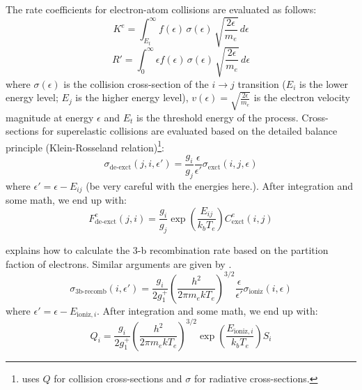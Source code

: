 The rate coefficients for electron-atom collisions are evaluated as follows: 
% 
\begin{equation}
    \label{eq:Rate_ElectronAtomCollisions}
    K^e = \int_{E_t}^\infty f(\epsilon) \, \sigma(\epsilon) \, \sqrt{\frac{2 \epsilon}{m_e}} \, d\epsilon
\end{equation}
% 
\begin{equation}
    \label{eq:Rate_RadiativeRecombination}
    R' = \int_{0}^\infty \epsilon f(\epsilon) \, \sigma(\epsilon) \, \sqrt{\frac{2 \epsilon}{m_e}} \, d\epsilon
\end{equation}
% 
where $\sigma(\epsilon)$ is the collision cross-section of the $i \rightarrow j$ transition ($E_i$ is the lower energy level; $E_j$ is the higher energy level), $v(\epsilon) = \sqrt{\frac{2 \epsilon}{m_e}}$ is the electron velocity magnitude at energy $\epsilon$ and $E_t$ is the threshold energy of the process. Cross-sections for superelastic collisions are evaluated based on the detailed balance principle (Klein-Rosseland relation)\footnote{\citet{oxenius2012kinetic} uses $Q$ for collision cross-sections and $\sigma$ for radiative cross-sections.}: 
%  
\begin{equation}
    \label{eq:cross-section_superelastic}
    \sigma_\text{de-exct}(j,i,\epsilon') = \frac{g_i}{g_j} \frac{\epsilon}{\epsilon'} \sigma_\text{exct}(i,j,\epsilon)  
\end{equation}
% 
where $\epsilon' = \epsilon - E_{ij}$ (be very careful with the energies here.). After integration and some math, we end up with:
%  
\begin{equation}
    \label{eq:cross-section_superelastic_rates}
    F_\text{de-exct}^e(j,i) = \frac{g_i}{g_j} \exp(\frac{E_{ij}}{k_b T_e}) C_\text{exct}^e(i,j)   
\end{equation}
% 



%  
\cite{kapper2011ionizing} explains how to calculate the 3-b recombination rate based on the partition faction of electrons. Similar arguments are given by \cite{kruger1973partially}.  
\begin{equation}
    \label{eq:cross-section_3b-recomb}
    \sigma_\text{3b-recomb}(i,\epsilon')  = \frac{g_i}{2 g_1^+} (\frac{h^2}{2 \pi m_e k T_e})^{3/2} \frac{\epsilon}{\epsilon'} \sigma_\text{ioniz}(i,\epsilon)  
\end{equation}
% 
where $\epsilon' = \epsilon - E_{\text{ioniz},i}$. After integration and some math, we end up with:
%  
\begin{equation}
    \label{eq:}
    Q_i = \frac{g_i}{2 g_1^+} (\frac{h^2}{2 \pi m_e k T_e})^{3/2} \exp(\frac{E_{\text{ioniz},i}}{k_b T_e}) S_i   
\end{equation}
% 

